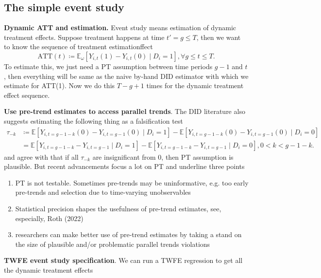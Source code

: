 \documentclass[12pt]{article}
\begin{document}
\subsection{The simple event study}

\textbf{Dynamic ATT and estimation.} Event study means estimation of dynamic treatment
effects. Suppose treatment happens at time \( t' = g \le T \), then we want
to know the sequence of treatment estimationffect
\[
  \text{ATT}(t) \coloneqq \mathbb{E}_{\omega}[Y_{i,t}(1) - Y_{i,t}(0) \mid D_i = 1],
  \forall g \le t \le T
.\]
To estimate this, we just need a PT assumption between time periods \( g-1 \) and \( t
\), then everything will be same as
the naive by-hand DID estimator with which we estimate for ATT(1). Now we do this \(
T-g+1 \) times for the dynamic
treatment effect sequence.

\textbf{Use pre-trend estimates to access parallel trends}. The DID literature also
suggests estimating the following thing
as a falsification test
\begin{align*}
  \tau_{-k} &\coloneqq \mathbb{E}[Y_{i,t=g-1-k}(0)-Y_{i,t=g-1}(0) \mid D_i = 1] -
  \mathbb{E}[Y_{i,t=g-1-k}(0)-Y_{i,t=g-1}(0) \mid D_i = 0] \\
  &= \mathbb{E}[Y_{i,t=g-1-k}-Y_{i,t=g-1} \mid D_i = 1] -
  \mathbb{E}[Y_{i,t=g-1-k}-Y_{i,t=g-1} \mid D_i = 0], 0 < k < g-1-k
  .
\end{align*}
and agree with that if all \( \tau_{-k} \) are insignificant from 0, then PT assumption
is plausible. But recent advancements
focus a lot on PT and underline three points
\begin{enumerate}
  \item PT is not testable. Sometimes pre-trends may be uninformative, e.g. too early
    pre-trends and selection due to time-varying unobservables
  \item Statistical precision shapes the usefulness of pre-trend estimates, see,
    especially, Roth (2022)
  \item researchers can make better use of pre-trend estimates by taking a stand on the
    size of plausible and/or problematic parallel trends violations
\end{enumerate}

\textbf{TWFE event study specification}. We can run a TWFE regression to get all the
dynamic treatment effects
\end{document}
